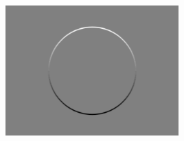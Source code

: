 \documentclass{beamer}
\begin{document}
\begin{frame}
\begin{columns}
\begin{column}{0.5\textwidth}
\begin{center}
                            \includegraphics[width=0.5\textwidth]{pictures/gradient_y.png}
                        \end{center}
                    \end{column}
                \end{columns}
            \end{frame}
\end{document}
